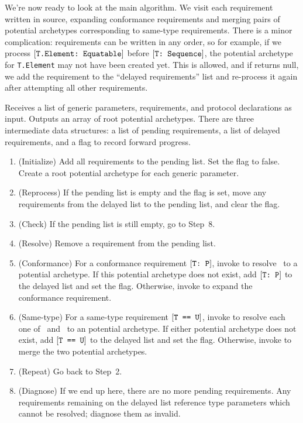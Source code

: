 \documentclass[../generics]{subfiles}
\begin{document}
We're now ready to look at the main algorithm. We visit each requirement written in source, expanding conformance requirements and merging pairs of potential archetypes corresponding to same-type requirements. There is a minor complication: requirements can be written in any order, so for example, if we process $[\texttt{T.Element:~Equatable}]$ before $[\texttt{T:~Sequence}]$, the potential archetype for \texttt{T.Element} may not have been created yet. This is allowed, and if  returns null, we add the requirement to the ``delayed requirements'' list and re-process it again after attempting all other requirements.
\begin{algorithm}\label{archetypebuilder} Receives a list of generic parameters, requirements, and protocol declarations as input. Outputs an array of root potential archetypes. There are three intermediate data structures: a list of pending requirements, a list of delayed requirements, and a flag to record forward progress.
\begin{enumerate}
\item (Initialize) Add all requirements to the pending list. Set the flag to false. Create a root potential archetype for each generic parameter.
\item (Reprocess) If the pending list is empty and the flag is set, move any requirements from the delayed list to the pending list, and clear the flag.
\item (Check) If the pending list is still empty, go to Step~8.
\item (Resolve) Remove a requirement from the pending list.
\item (Conformance) For a conformance requirement $[\texttt{T:~P}]$, invoke  to resolve \tT\ to a potential archetype. If this potential archetype does not exist, add $[\texttt{T:~P}]$ to the delayed list and set the flag. Otherwise, invoke  to expand the conformance requirement.
\item (Same-type) For a same-type requirement $[\texttt{T == U}]$, invoke  to resolve each one of \tT\ and \tU\ to an potential archetype. If either potential archetype does not exist, add $[\texttt{T == U}]$ to the delayed list and set the flag. Otherwise, invoke  to merge the two potential archetypes.
\item (Repeat) Go back to Step~2.
\item (Diagnose) If we end up here, there are no more pending requirements. Any requirements remaining on the delayed list reference type parameters which cannot be resolved; diagnose them as invalid.
\end{enumerate}
\end{algorithm}
\end{document}
